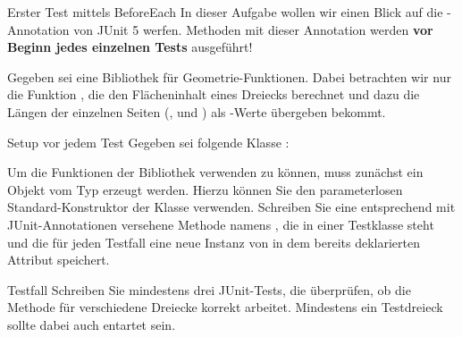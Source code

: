 \documentclass{../tuda-exercise}
\begin{document}
  \clearpage

  \begin{task}[credit=\stars{2}{3}]{Erster Test mittels BeforeEach}
    In dieser Aufgabe wollen wir einen Blick auf die -Annotation von JUnit
    5 werfen. Methoden mit dieser Annotation werden \textbf{vor Beginn jedes einzelnen Tests}
    ausgeführt!

    \br

    Gegeben sei eine Bibliothek für Geometrie-Funktionen. Dabei betrachten wir nur die Funktion
    , die den Flächeninhalt eines Dreiecks berechnet und dazu die Längen
    der einzelnen Seiten  (,  und ) als
    -Werte übergeben bekommt.

    \begin{subtask*}{Setup vor jedem Test}
      Gegeben sei folgende Klasse :

      

      Um die Funktionen der Bibliothek verwenden zu können, muss zunächst ein Objekt vom Typ
       erzeugt werden. Hierzu können Sie den parameterlosen
      Standard-Konstruktor der Klasse  verwenden. Schreiben Sie eine
      entsprechend mit JUnit-Annotationen versehene Methode namens , die in
      einer Testklasse steht und die für jeden Testfall eine neue Instanz von 
      in dem bereits deklarierten Attribut  speichert.

      \begin{solution}
        
      \end{solution}
    \end{subtask*}

    \clearpagesolution

    \begin{subtask*}{Testfall}
      Schreiben Sie mindestens drei JUnit-Tests, die überprüfen, ob die Methode
       für verschiedene Dreiecke korrekt arbeitet. Mindestens ein Testdreieck
      sollte dabei auch entartet sein.

      \begin{solution}
        
      \end{solution}
    \end{subtask*}
  \end{task}
\end{document}
